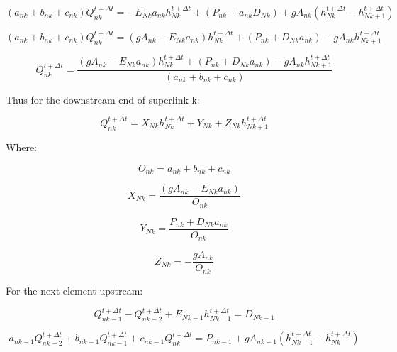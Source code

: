\documentclass[11pt]{article}
\begin{document}
\begin{equation}
  (a_{nk} + b_{nk} + c_{nk}) Q_{nk}^{t + \Delta t} = - E_{Nk} a_{nk} h_{Nk}^{t + \Delta t} + (P_{nk} + a_{nk} D_{Nk}) + g A_{nk} (h_{Nk}^{t + \Delta t} - h_{Nk + 1}^{t + \Delta t})
\end{equation}

\begin{equation}
  (a_{nk} + b_{nk} + c_{nk}) Q_{nk}^{t + \Delta t} = ( g A_{nk} - E_{Nk} a_{nk} ) h_{Nk}^{t + \Delta t} + (P_{nk} +  D_{Nk} a_{nk}) - g A_{nk} h_{Nk + 1}^{t + \Delta t}
\end{equation}


\begin{equation}
  Q_{nk}^{t + \Delta t} = \frac{( g A_{nk} -  E_{Nk} a_{nk} ) h_{Nk}^{t + \Delta t} + (P_{nk} +  D_{Nk} a_{nk}) - g A_{nk} h_{Nk + 1}^{t + \Delta t}}{(a_{nk} + b_{nk} + c_{nk})}
\end{equation}

Thus for the downstream end of superlink k:

\begin{equation}
  \boxed{
  Q_{nk}^{t + \Delta t} = X_{Nk} h_{Nk}^{t + \Delta t} + Y_{Nk} + Z_{Nk} h_{Nk + 1}^{t + \Delta t}
  }
\end{equation}

Where:

\begin{equation}
  \boxed{
  O_{nk} = a_{nk} + b_{nk} + c_{nk}
  }
\end{equation}

\begin{equation}
  \boxed{
  X_{Nk} = \frac{( g A_{nk} - E_{Nk} a_{nk} )}{O_{nk}}
  }
\end{equation}

\begin{equation}
  \boxed{
  Y_{Nk} = \frac{P_{nk} +  D_{Nk} a_{nk}}{O_{nk}}
  } 
\end{equation}

\begin{equation}
  \boxed{
  Z_{Nk} = - \frac{g A_{nk}}{O_{nk}}
  } 
\end{equation}

For the next element upstream:

\begin{equation}
  Q_{nk - 1}^{t + \Delta t} - Q_{nk - 2}^{t + \Delta t} + E_{Nk - 1} h_{Nk - 1}^{t + \Delta t} = D_{Nk - 1}
\end{equation}


\begin{equation}
   a_{nk - 1} Q_{nk - 2}^{t + \Delta t} + b_{nk - 1} Q_{nk - 1}^{t + \Delta t} + c_{nk - 1} Q_{nk}^{t + \Delta t} = P_{nk - 1} + g A_{nk - 1} (h_{Nk - 1}^{t + \Delta t} - h_{Nk}^{t + \Delta t})
\end{equation}
\end{document}
